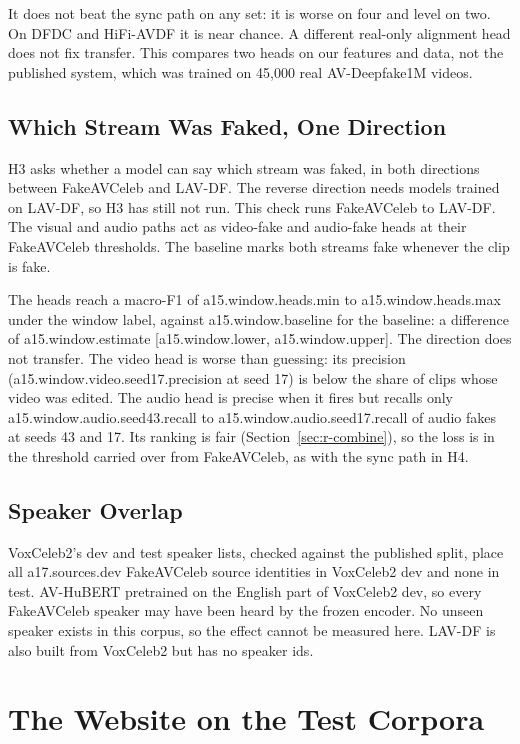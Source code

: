It does not beat the sync path on any set: it is worse on four and level on
two. On DFDC and HiFi-AVDF it is near chance. A different real-only alignment
head does not fix transfer. This compares two heads on our features and data,
not the published system, which was trained on 45,000 real AV-Deepfake1M
videos.

\subsection{Which Stream Was Faked, One Direction}

H3 asks whether a model can say which stream was faked, in both directions
between FakeAVCeleb and LAV-DF. The reverse direction needs models trained on
LAV-DF, so H3 has still not run. This check runs FakeAVCeleb to LAV-DF. The visual
and audio paths act as video-fake and audio-fake heads at their FakeAVCeleb
thresholds. The baseline marks both streams fake whenever the clip is fake.

The heads reach a macro-F1 of {{a15.window.heads.min}} to
{{a15.window.heads.max}} under the window label, against
{{a15.window.baseline}} for the baseline: a difference of
{{a15.window.estimate}} [{{a15.window.lower}}, {{a15.window.upper}}]. The
direction does not transfer. The video head is worse than guessing: its
precision ({{a15.window.video.seed17.precision}} at seed 17) is below the
share of clips whose video was edited. The audio head is precise when it fires
but recalls only {{a15.window.audio.seed43.recall}} to
{{a15.window.audio.seed17.recall}} of audio fakes at seeds 43 and 17. Its
ranking is fair (Section~\ref{sec:r-combine}), so the loss is in the threshold carried
over from FakeAVCeleb, as with the sync path in H4.

\subsection{Speaker Overlap}

VoxCeleb2's dev and test speaker lists, checked against the published split,
place all {{a17.sources.dev}} FakeAVCeleb source identities in VoxCeleb2 dev
and none in test. AV-HuBERT pretrained on the English part of VoxCeleb2 dev,
so every FakeAVCeleb speaker may have been heard by the frozen encoder. No
unseen speaker exists in this corpus, so the effect cannot be measured here.
LAV-DF is also built from VoxCeleb2 but has no speaker ids.
\section{The Website on the Test Corpora}
\label{sec:r-website}

